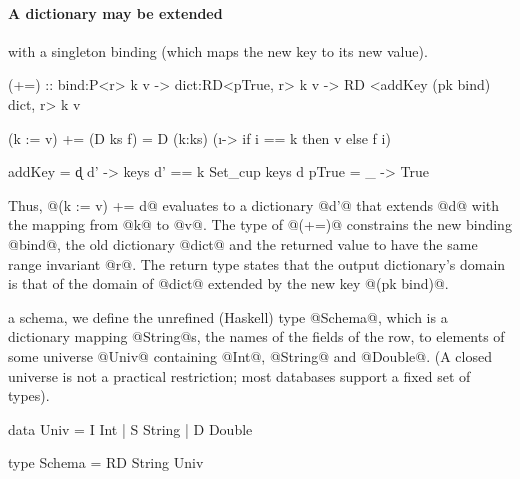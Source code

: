 \paragraph{A dictionary may be extended} with a singleton
binding (which maps the new key to its new value). 
%
\begin{code}
  (+=)   :: bind:P<r> k v 
         -> dict:RD<pTrue, r> k v 
         -> RD <addKey (pk bind) dict, r> k v
 
  (k := v) += (D ks f) 
         = D (k:ks) (\i -> if i == k then v else f i)
  
  addKey = \k d d' -> keys d' == {k} Set_cup keys d
  pTrue  = \_ -> True
\end{code}
%
Thus, @(k := v)  += d@ evaluates to 
a dictionary @d'@ that extends @d@ 
with the mapping from @k@ to @v@.
%
The type of @(+=)@ constrains the new binding @bind@, 
the old dictionary @dict@ and the returned value to have 
the same range invariant @r@.
%
The return type states that the output dictionary's 
domain is that of the domain of @dict@ extended by 
the new key @(pk bind)@.

 \ie a schema, 
we define the unrefined (Haskell) type @Schema@, 
which is a dictionary mapping @String@s, \ie the 
names of the fields of the row, to elements of 
some universe @Univ@ containing @Int@, @String@ 
and @Double@.
%
(A closed universe is not a practical restriction; 
most databases support a fixed set of types).
% 
\begin{code}
  data Univ   = I Int | S String | D Double

  type Schema = RD String Univ
\end{code}

